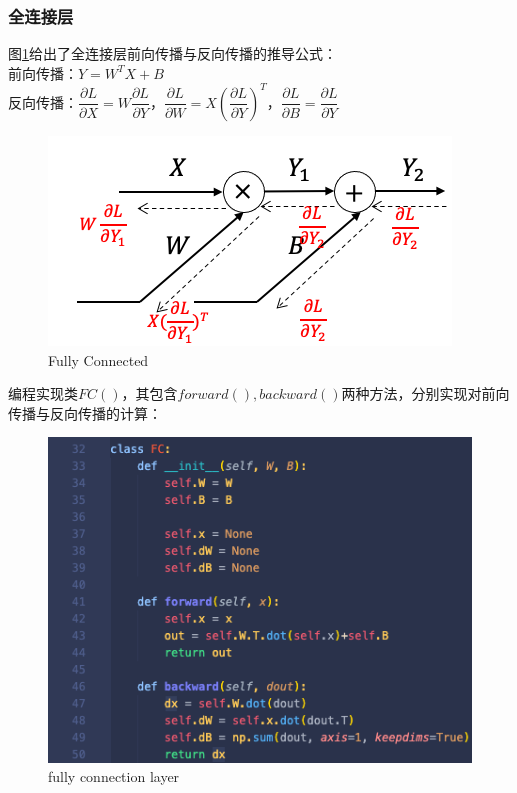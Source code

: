 \documentclass{article}
\begin{document}
\subsubsection{全连接层}
图\ref{fig2}给出了全连接层前向传播与反向传播的推导公式：\\
前向传播：$ Y=W^TX+B $\\
反向传播：$ \dfrac{\partial{L}}{\partial{X}}= W\dfrac{\partial{L}}{\partial{Y}}$，$ \dfrac{\partial{L}}{\partial{W}}= X(\dfrac{\partial{L}}{\partial{Y}})^T$，$ \dfrac{\partial{L}}{\partial{B}}= \dfrac{\partial{L}}{\partial{Y}}$
\begin{figure}[H]
	\centering
	\includegraphics[scale=0.6]{FC.png}
	\caption{Fully Connected}
	\label{fig2}
\end{figure}
编程实现类$ FC() $，其包含$ forward(),backward() $两种方法，分别实现对前向传播与反向传播的计算：
\begin{figure}[H]
	\centering
	\includegraphics{fclayer.png}
	\caption{fully connection layer}
\end{figure}
\end{document}
